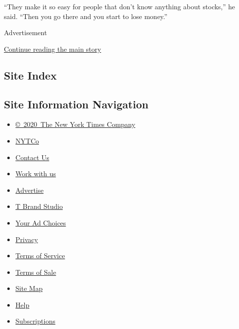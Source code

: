 ``They make it so easy for people that don't know anything about
stocks,'' he said. ``Then you go there and you start to lose money.''

Advertisement

\protect\hyperlink{after-bottom}{Continue reading the main story}

\hypertarget{site-index}{%
\subsection{Site Index}\label{site-index}}

\hypertarget{site-information-navigation}{%
\subsection{Site Information
Navigation}\label{site-information-navigation}}

\begin{itemize}
\tightlist
\item
  \href{https://help.nytimes3xbfgragh.onion/hc/en-us/articles/115014792127-Copyright-notice}{©~2020~The
  New York Times Company}
\end{itemize}

\begin{itemize}
\tightlist
\item
  \href{https://www.nytco.com/}{NYTCo}
\item
  \href{https://help.nytimes3xbfgragh.onion/hc/en-us/articles/115015385887-Contact-Us}{Contact
  Us}
\item
  \href{https://www.nytco.com/careers/}{Work with us}
\item
  \href{https://nytmediakit.com/}{Advertise}
\item
  \href{http://www.tbrandstudio.com/}{T Brand Studio}
\item
  \href{https://www.nytimes3xbfgragh.onion/privacy/cookie-policy\#how-do-i-manage-trackers}{Your
  Ad Choices}
\item
  \href{https://www.nytimes3xbfgragh.onion/privacy}{Privacy}
\item
  \href{https://help.nytimes3xbfgragh.onion/hc/en-us/articles/115014893428-Terms-of-service}{Terms
  of Service}
\item
  \href{https://help.nytimes3xbfgragh.onion/hc/en-us/articles/115014893968-Terms-of-sale}{Terms
  of Sale}
\item
  \href{https://spiderbites.nytimes3xbfgragh.onion}{Site Map}
\item
  \href{https://help.nytimes3xbfgragh.onion/hc/en-us}{Help}
\item
  \href{https://www.nytimes3xbfgragh.onion/subscription?campaignId=37WXW}{Subscriptions}
\end{itemize}
